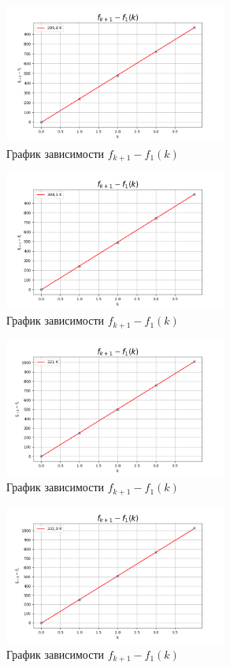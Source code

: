 \documentclass[a4paper]{article}
\begin{document}
\begin{figure}
    \centering
    \includegraphics[width=0.65\textwidth]{g295.png}
    \caption{График зависимости $f_{k+1}-f_{1}(k)$}
\end{figure}

\begin{figure}
    \centering
    \includegraphics[width=0.65\textwidth]{g308.png}
    \caption{График зависимости $f_{k+1}-f_{1}(k)$}
\end{figure}

\begin{figure}
    \centering
    \includegraphics[width=0.65\textwidth]{g321.png}
    \caption{График зависимости $f_{k+1}-f_{1}(k)$}
\end{figure}

\begin{figure}
    \centering
    \includegraphics[width=0.65\textwidth]{331.png}
    \caption{График зависимости $f_{k+1}-f_{1}(k)$}
\end{figure}
\end{document}
